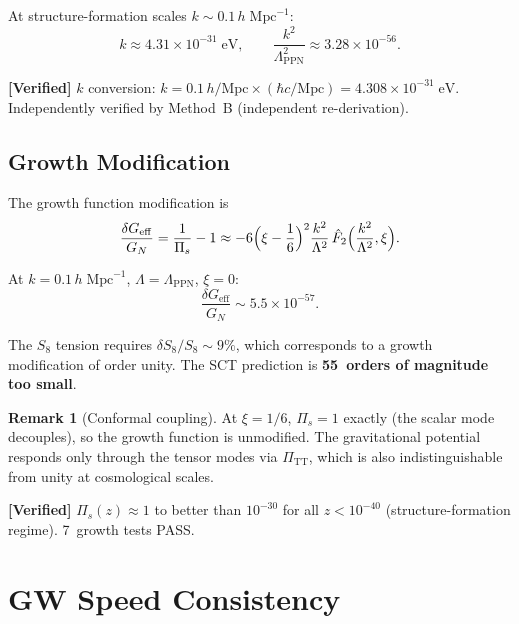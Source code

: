 \documentclass[11pt,a4paper]{article}
\newcommand{\Lam}{\Lambda}
\theoremstyle{plain}
\theoremstyle{definition}
\newtheorem{remark}[theorem]{Remark}
\newcommand{\verified}[1]{%
  \par\smallskip\noindent
  \colorbox{green!10}{\parbox{\dimexpr\linewidth-2\fboxsep}{%
    \textcolor{green!50!black}{\textbf{[Verified]}} #1}}%
  \par\smallskip}
\begin{document}
At structure-formation scales $k \sim 0.1\,h\;\mathrm{Mpc}^{-1}$:
\begin{equation}\label{eq:k-eV}
  k \approx 4.31 \times 10^{-31}\;\mathrm{eV},
  \qquad
  \frac{k^2}{\Lam_{\mathrm{PPN}}^2}
  \approx 3.28 \times 10^{-56}.
\end{equation}

\verified{$k$ conversion: $k = 0.1\,h/\mathrm{Mpc} \times
(\hbar c/\mathrm{Mpc}) = 4.308 \times 10^{-31}\;\mathrm{eV}$.
Independently verified by Method~B (independent re-derivation).}

\subsection{Growth Modification}

The growth function modification is
\begin{equation}\label{eq:growth-mod}
  \frac{\delta G_{\mathrm{eff}}}{G_N}
  = \frac{1}{\Pi_s} - 1
  \approx -6\Bigl(\xi - \frac{1}{6}\Bigr)^2
    \frac{k^2}{\Lam^2}\,\hat{F}_2\Bigl(\frac{k^2}{\Lam^2},\xi\Bigr).
\end{equation}

At $k = 0.1\,h\;\mathrm{Mpc}^{-1}$, $\Lam = \Lam_{\mathrm{PPN}}$,
$\xi = 0$:
\begin{equation}\label{eq:growth-value}
  \boxed{
  \frac{\delta G_{\mathrm{eff}}}{G_N}
  \sim 5.5 \times 10^{-57}.
  }
\end{equation}

The $S_8$ tension requires $\delta S_8/S_8 \sim 9\%$, which corresponds
to a growth modification of order unity. The SCT prediction is
\textbf{55~orders of magnitude too small}.

\begin{remark}[Conformal coupling]
At $\xi = 1/6$, $\Pi_s = 1$ exactly (the scalar mode decouples), so
the growth function is unmodified. The gravitational potential responds
only through the tensor modes via $\Pi_{\mathrm{TT}}$, which is also
indistinguishable from unity at cosmological scales.
\end{remark}

\verified{$\Pi_s(z) \approx 1$ to better than $10^{-30}$ for all
$z < 10^{-40}$ (structure-formation regime). 7~growth tests PASS.}

\section{GW Speed Consistency}\label{sec:gw}
\end{document}
